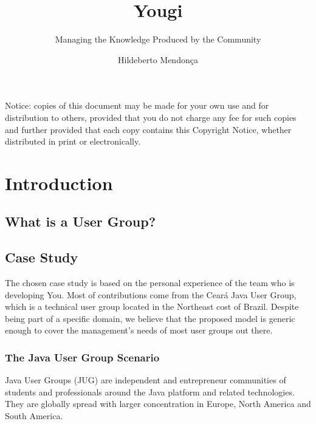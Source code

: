 \documentclass[envcountsame,envcountchap,letterpaper]{svmono}
\author{Hildeberto Mendon\c{c}a}
\title{Yougi}
\subtitle{Managing the Knowledge Produced by the Community}
\begin{document}
\maketitle

\frontmatter

\thispagestyle{empty}
\vspace*{3.5cm}
\begin{flushleft}
Notice: copies of this document may be made for your own use and for distribution to others, provided that you do not charge any fee for such copies and further provided that each copy contains this Copyright Notice, whether distributed in print or electronically.
\end{flushleft}

\tableofcontents

\listoffigures

\listoftables

\mainmatter

\chapter{Introduction}

\section{What is a User Group?}

\section{Case Study}

The chosen case study is based on the personal experience of the team who is developing You. Most of contributions come from the Cear\'{a} Java User Group, which is a technical user group located in the Northeast cost of Brazil. Despite being part of a specific domain, we believe that the proposed model is generic enough to cover the management's needs of most user groups out there.

\subsection{The Java User Group Scenario}

Java User Groups (JUG) are independent and entrepreneur communities of students and professionals around the Java platform and related technologies. They are globally spread with larger concentration in Europe, North America and South America.
\end{document}
